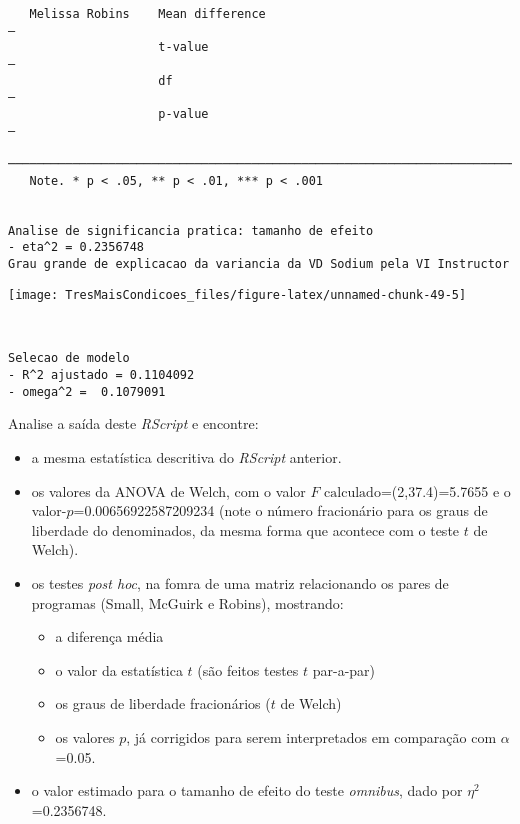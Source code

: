\documentclass[]{article}
\providecommand{\tightlist}{%
  \setlength{\itemsep}{0pt}\setlength{\parskip}{0pt}}
\begin{document}
\begin{verbatim}
   Melissa Robins    Mean difference                                                   —   
                     t-value                                                           —   
                     df                                                                —   
                     p-value                                                           —   
 ───────────────────────────────────────────────────────────────────────────────────────── 
   Note. * p < .05, ** p < .01, *** p < .001


Analise de significancia pratica: tamanho de efeito
- eta^2 = 0.2356748 
Grau grande de explicacao da variancia da VD Sodium pela VI Instructor 
\end{verbatim}

\begin{center}\texttt{[image: TresMaisCondicoes\_files/figure-latex/unnamed-chunk-49-5]} \end{center}

\begin{verbatim}


Selecao de modelo
- R^2 ajustado = 0.1104092 
- omega^2 =  0.1079091 
\end{verbatim}

Analise a saída deste \emph{RScript} e encontre:

\begin{itemize}
\tightlist
\item
  a mesma estatística descritiva do \emph{RScript} anterior.
\item
  os valores da ANOVA de Welch, com o valor
  \(F\text{ calculado}\)=(2,37.4)=5.7655 e o
  valor-\(p\)=0.00656922587209234 (note o número fracionário para os
  graus de liberdade do denominados, da mesma forma que acontece com o
  teste \(t\) de Welch).
\item
  os testes \emph{post hoc}, na fomra de uma matriz relacionando os
  pares de programas (Small, McGuirk e Robins), mostrando:

  \begin{itemize}
  \tightlist
  \item
    a diferença média
  \item
    o valor da estatística \(t\) (são feitos testes \(t\) par-a-par)
  \item
    os graus de liberdade fracionários (\(t\) de Welch)
  \item
    os valores \(p\), já corrigidos para serem interpretados em
    comparação com \(\alpha\)=0.05.
  \end{itemize}
\item
  o valor estimado para o tamanho de efeito do teste \emph{omnibus},
  dado por \(\eta^2\)=0.2356748.
\end{itemize}
\end{document}
